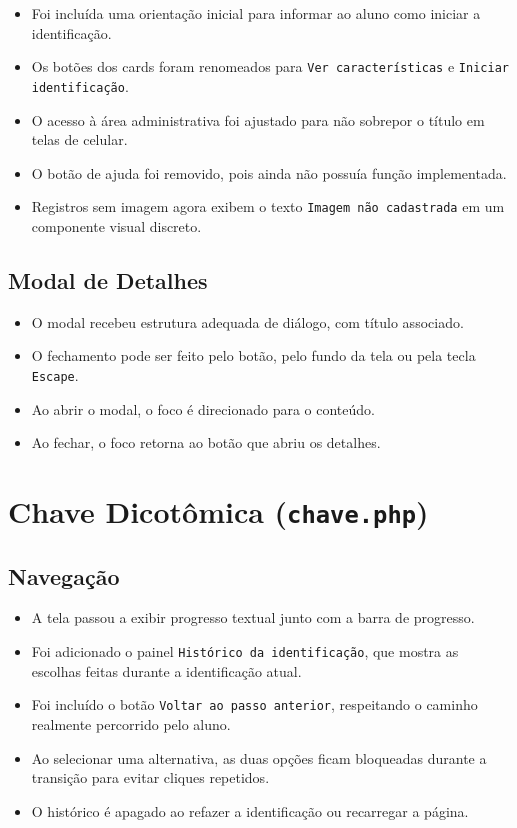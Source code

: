 \documentclass[12pt,a4paper]{article}
\begin{document}
\begin{itemize}
  \item Foi incluída uma orientação inicial para informar ao aluno como iniciar a identificação.
  \item Os botões dos cards foram renomeados para \texttt{Ver características} e \texttt{Iniciar identificação}.
  \item O acesso à área administrativa foi ajustado para não sobrepor o título em telas de celular.
  \item O botão de ajuda foi removido, pois ainda não possuía função implementada.
  \item Registros sem imagem agora exibem o texto \texttt{Imagem não cadastrada} em um componente visual discreto.
\end{itemize}

\subsection{Modal de Detalhes}

\begin{itemize}
  \item O modal recebeu estrutura adequada de diálogo, com título associado.
  \item O fechamento pode ser feito pelo botão, pelo fundo da tela ou pela tecla \texttt{Escape}.
  \item Ao abrir o modal, o foco é direcionado para o conteúdo.
  \item Ao fechar, o foco retorna ao botão que abriu os detalhes.
\end{itemize}

\section{Chave Dicotômica (\texttt{chave.php})}

\subsection{Navegação}

\begin{itemize}
  \item A tela passou a exibir progresso textual junto com a barra de progresso.
  \item Foi adicionado o painel \texttt{Histórico da identificação}, que mostra as escolhas feitas durante a identificação atual.
  \item Foi incluído o botão \texttt{Voltar ao passo anterior}, respeitando o caminho realmente percorrido pelo aluno.
  \item Ao selecionar uma alternativa, as duas opções ficam bloqueadas durante a transição para evitar cliques repetidos.
  \item O histórico é apagado ao refazer a identificação ou recarregar a página.
\end{itemize}
\end{document}
